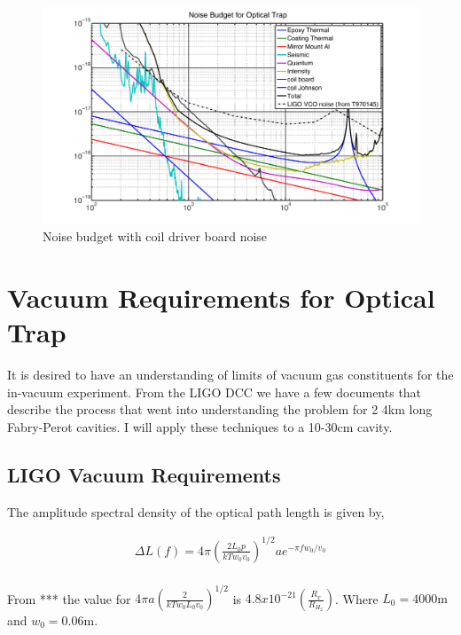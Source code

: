 \begin{figure}[htbp]
	\centering
		\includegraphics[width=15cm]{./figures/NoiseBudgetBoard.pdf}
	\caption[Noise Budget Board]{Noise budget with coil driver board noise}
	\label{fig:noise_bud_brd}
\end{figure}

\section{Vacuum Requirements for Optical Trap}

It is desired to have an understanding of limits of vacuum gas constituents for the in-vacuum experiment. From the LIGO DCC we have a few documents that describe the process that went into understanding the problem for 2 4km long Fabry-Perot cavities. I will apply these techniques to a 10-30cm cavity.\\


\subsection{LIGO Vacuum Requirements}

The amplitude spectral density of the optical path length is given by,

\begin{align*}
\Delta L ( f ) = 4 \pi \left( \frac{2 L_0 p}{k T w_0 v_0} \right)^{1/2} a e^{- \pi f w_0 / v_0 }
\end{align*} \\


From *** the value for $4 \pi a \left( \frac{2}{k T w_0 L_0 v_0} \right)^{1/2} $ is $ 4.8 x 10^{-21} \left( \frac{R_x}{R_{H_2}} \right) $. Where $L_0 = 4000 \mathrm{m} $ and $ w_0 = 0.06 \mathrm{m} $. \\

